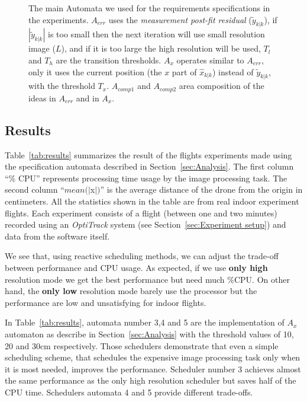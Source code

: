 \documentclass{sig-alternate-ipsn13}
\begin{document}
\begin{figure}[htbp]
\begin{tabular}{c c}
        
    \end{tabular}
    
    \caption{The main Automata we used for the requirements specifications in the experiments. 
        \newline $A_{err}$ uses the \textit{measurement post-fit residual} ($\tilde{y}_{k|k}$), if $|\tilde{y}_{k|k}|$ is too small then the next iteration will use small resolution image ($L$), and if it is too large the high resolution will be used, $T_l$ and $T_h$ are the transition thresholds.
         $A_x$ operates similar to $A_{err}$, only it uses the current position (the $x$ part of $\hat{x}_{k|k}$) instead of $\tilde{y}_{k|k}$, with the threshold $T_x$.
         $A_{comp1}$ and $A_{comp2}$ area composition of the ideas in $A_{err}$ and in $A_x$.}
    
    \label{fig:test_automata}
\end{figure}


\subsection{Results}
\label{sec:results}

Table~\ref{tab:results} summarizes the result of the flights experiments made using the specification automata described in Section~\ref{sec:Analysis}.
The first column ``\% CPU'' represents processing time usage by the image processing task.
The second column ``$mean(|$x$|)$'' is the average distance of the drone from the origin in centimeters.
All the statistics shown in the table are from real indoor experiment flights. Each experiment consists of a flight (between one and two minutes) recorded using an \textit{OptiTrack} system (see Section~\ref{sec:Experiment setup}) and data from the software itself.

We see that, using reactive scheduling methods, we can adjust the trade-off between performance and CPU usage. As expected, if we use \textbf{only high} resolution mode we get the best performance but need much \%CPU. On other hand, the \textbf{only low} resolution mode barely use the processor but the performance are low and unsatisfying for indoor flights.

In Table~\ref{tab:results}, automata number 3,4 and 5 are the implementation of $A_{x}$ automaton as describe in Section~\ref{sec:Analysis} with the threshold values of 10, 20 and 30cm respectively.
Those schedulers demonstrate that even a simple scheduling scheme, that schedules the expensive image processing task only when it is most needed, improves the performance. Scheduler number 3 achieves almost the same performance as the only high resolution scheduler but saves half of the CPU time. Schedulers automata 4 and 5 provide different trade-offs.
\end{document}
